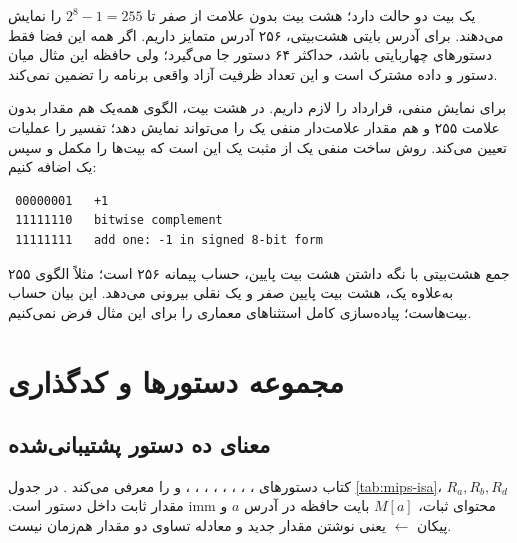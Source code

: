 یک بیت دو حالت دارد؛ هشت بیت بدون علامت از صفر تا \(2^8-1=255\)
را نمایش می‌دهند. برای آدرس بایتی هشت‌بیتی، ۲۵۶ آدرس متمایز داریم.
اگر همه این فضا فقط دستورهای چهار‌بایتی باشد، حداکثر ۶۴ دستور جا می‌گیرد؛
ولی حافظه این مثال میان دستور و داده مشترک است و این تعداد ظرفیت آزاد واقعی برنامه را تضمین نمی‌کند.

برای نمایش منفی، قرارداد  را لازم داریم.
در هشت بیت، الگوی همه‌یک هم مقدار بدون علامت ۲۵۵ و هم مقدار علامت‌دار منفی یک
را می‌تواند نمایش دهد؛ تفسیر را عملیات تعیین می‌کند.
روش ساخت منفی یک از مثبت یک این است که بیت‌ها را مکمل و سپس یک اضافه کنیم:
\begin{latin}
\begin{verbatim}
 00000001   +1
 11111110   bitwise complement
 11111111   add one: -1 in signed 8-bit form
\end{verbatim}
\end{latin}
جمع هشت‌بیتی با نگه داشتن هشت بیت پایین، حساب پیمانه ۲۵۶ است؛
مثلاً الگوی ۲۵۵ به‌علاوه یک، هشت بیت پایین صفر و یک نقلی بیرونی می‌دهد.
این بیان حساب بیت‌هاست؛ پیاده‌سازی کامل استثناهای معماری  را برای این مثال فرض نمی‌کنیم.

\section{مجموعه دستورها و کدگذاری}
\subsection{معنای ده دستور پشتیبانی‌شده}
کتاب دستورهای ، ، ، ، ،
، ، ،  و  را معرفی می‌کند
\cite[جدول ]{weste}.
در جدول \ref{tab:mips-isa}، \(R_a,R_b,R_d\) محتوای ثبات، \(M[a]\)
بایت حافظه در آدرس \(a\) و \(\mathrm{imm}\) مقدار ثابت داخل دستور است.
پیکان \(\leftarrow\) یعنی نوشتن مقدار جدید و معادله تساوی دو مقدار هم‌زمان نیست.

